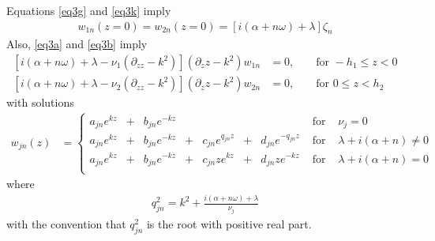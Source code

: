 \documentclass[prfluids]{revtex4-2}
\begin{document}
Equations \eqref{eq3g} and \eqref{eq3k} imply
\begin{align}
  \label{eq7}
  w_{1n} (z=0) = w_{2n} (z=0) = [i(\alpha + n\omega) + \lambda] \zeta_n
\end{align}
Also, \eqref{eq3a} and \eqref{eq3b} imply
\begin{subequations}
  \begin{align}
    \label{eq8a}
    [i(\alpha + n\omega) + \lambda - \nu_1 (\partial_{zz} - k^2)](\partial_zz - k^2) w_{1n} &= 0, && \text{ for } -h_1 \leq z < 0
    \\
    \label{eq8b}
    [i(\alpha + n\omega) + \lambda - \nu_2 (\partial_{zz} - k^2)](\partial_zz - k^2) w_{2n} &= 0, && \text{ for } 0 \leq z < h_2
  \end{align}
\end{subequations}
with solutions
\begin{align}
  \label{eq9}
  w_{jn}(z) &=
  \left\lbrace\begin{matrix}
    a_{jn}e^{kz} &+& b_{jn}e^{-kz}
    &&&&& \text{ for } &\nu_j = 0 
    \\
    a_{jn}e^{kz}    &+& b_{jn}e^{-kz}&+&
    c_{jn}e^{q_{jn}z} &+& d_{jn}e^{-q_{jn}z}
    & \text{ for } &\lambda + i (\alpha + n) \neq 0 
    \\
    a_{jn}e^{kz}  &+& b_{jn}e^{-kz}&+&
    c_{jn}ze^{kz} &+& d_{jn}ze^{-kz}
    & \text{ for } & \lambda + i (\alpha + n) = 0 \\
  \end{matrix}\right.
\end{align}
where 
\begin{align}
  \label{eq10}
  q^2_{jn} = k^2 + \frac{i(\alpha + n\omega) + \lambda}{\nu_j}
\end{align}
with the convention that $q^2_{jn}$ is the root with positive real part.
\end{document}
